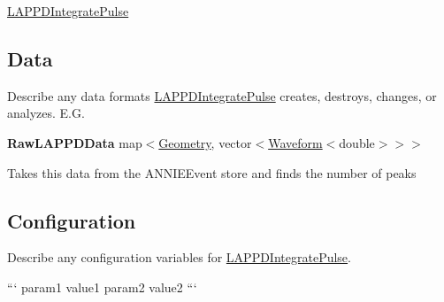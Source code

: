 \hyperlink{classLAPPDIntegratePulse}{L\-A\-P\-P\-D\-Integrate\-Pulse}

\subsection*{Data}

Describe any data formats \hyperlink{classLAPPDIntegratePulse}{L\-A\-P\-P\-D\-Integrate\-Pulse} creates, destroys, changes, or analyzes. E.\-G.

{\bfseries Raw\-L\-A\-P\-P\-D\-Data} {\ttfamily map$<$\hyperlink{classGeometry}{Geometry}, vector$<$\hyperlink{classWaveform}{Waveform}$<$double$>$$>$$>$}
\begin{DoxyItemize}
\item Takes this data from the {\ttfamily A\-N\-N\-I\-E\-Event} store and finds the number of peaks
\end{DoxyItemize}

\subsection*{Configuration}

Describe any configuration variables for \hyperlink{classLAPPDIntegratePulse}{L\-A\-P\-P\-D\-Integrate\-Pulse}.

``` param1 value1 param2 value2 ``` 